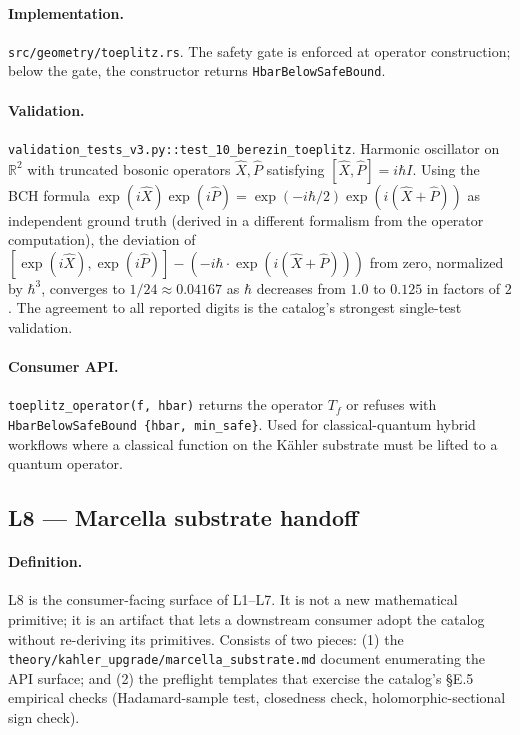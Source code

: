 \documentclass[11pt,letterpaper]{article}
\begin{document}
\paragraph{Implementation.}
\texttt{src/geometry/toeplitz.rs}. The safety
gate is enforced at operator construction; below the gate, the
constructor returns \verb|HbarBelowSafeBound|.

\paragraph{Validation.}
\texttt{validation\_tests\_v3.py::test\_10\_berezin\_toeplitz}.
Harmonic oscillator on $\mathbb{R}^2$ with truncated bosonic
operators $\hat X, \hat P$ satisfying $[\hat X, \hat P] = i \hbar I$.
Using the BCH formula
$\exp(i \hat X) \exp(i \hat P) = \exp(-i \hbar / 2) \exp(i(\hat X +
\hat P))$ as independent ground truth (derived in a different
formalism from the operator computation), the deviation of
$[\exp(i \hat X), \exp(i \hat P)] - (-i \hbar \cdot \exp(i(\hat X +
\hat P)))$ from zero, normalized by $\hbar^3$, converges to
$1/24 \approx 0.04167$ as $\hbar$ decreases from $1.0$ to $0.125$
in factors of $2$. The agreement to all reported digits is the
catalog's strongest single-test validation.

\paragraph{Consumer API.}
\texttt{toeplitz\_operator(f, hbar)} returns the operator $T_f$ or
refuses with \texttt{HbarBelowSafeBound \{hbar, min\_safe\}}. Used
for classical-quantum hybrid workflows where a classical function on
the K\"ahler substrate must be lifted to a quantum operator.


\subsection{L8 --- Marcella substrate handoff}

\paragraph{Definition.}
L8 is the consumer-facing surface of L1--L7. It is not a new
mathematical primitive; it is an artifact that lets a downstream
consumer adopt the catalog without re-deriving its primitives.
Consists of two pieces: (1) the
\texttt{theory/kahler\_upgrade/marcella\_substrate.md} document
enumerating the API surface; and (2) the preflight templates that
exercise the catalog's \S E.5 empirical checks
(Hadamard-sample test, closedness check, holomorphic-sectional
sign check).
\end{document}
